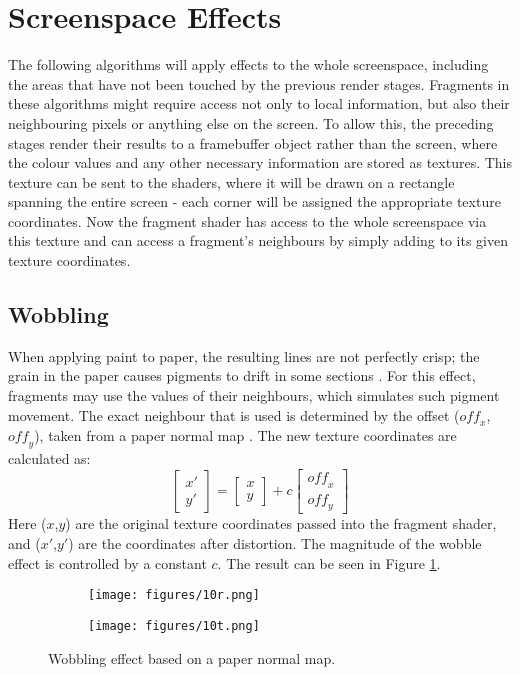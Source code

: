 \documentclass[a4paper,10pt]{article}
\begin{document}

\section{Screenspace Effects}
The following algorithms will apply effects to the whole screenspace, including the areas that have not been touched by the previous render stages. Fragments in these algorithms might require access not only to local information, but also their neighbouring pixels or anything else on the screen. To allow this, the preceding stages render their results to a framebuffer object rather than the screen, where the colour values and any other necessary information are stored as textures. This texture can be sent to the shaders, where it will be drawn on a rectangle spanning the entire screen - each corner will be assigned the appropriate texture coordinates. Now the fragment shader has access to the whole screenspace via this texture and can access a fragment's neighbours by simply adding to its given texture coordinates.


\subsection{Wobbling}
When applying paint to paper, the resulting lines are not perfectly crisp; the grain in the paper causes pigments to drift in some sections \cite{Curtis1997}. For this effect, fragments may use the values of their neighbours, which simulates such pigment movement. The exact neighbour that is used is determined by the offset ($\mathit{off}_x$, $\mathit{off}_y$), taken from a paper normal map \cite{Nienhaus2005}. The new texture coordinates are calculated as:
$$\begin{bmatrix}x'\\y'\end{bmatrix} = \begin{bmatrix}x\\y\end{bmatrix} + c\begin{bmatrix}\mathit{off}_x\\\mathit{off}_y\end{bmatrix}$$
Here ($x$,$y$) are the original texture coordinates passed into the fragment shader, and ($x'$,$y'$) are the coordinates after distortion. The magnitude of the wobble effect is controlled by a constant $c$. The result can be seen in Figure \ref{wobble}.

\begin{figure}[htbp!]
  \centering
  \begin{subfigure}{0.5\columnwidth}
    \texttt{[image: figures/10r.png]}
  \end{subfigure}
  \begin{subfigure}{0.3\columnwidth}
    \texttt{[image: figures/10t.png]}
  \end{subfigure}
  \caption{Wobbling effect based on a paper normal map.}
  \label{wobble}
\end{figure}
\end{document}
